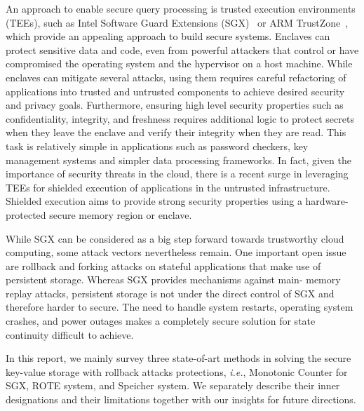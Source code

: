An approach to enable secure query processing is trusted execution environments (TEEs), such as Intel Software Guard Extensions 
(SGX)~\cite{sgxexplained} or ARM TrustZone~\cite{winter2008trusted}, which provide an appealing approach to build secure systems. Enclaves can protect sensitive data and code, even from powerful attackers that control or have compromised the operating system and the hypervisor on a host machine. While enclaves can mitigate several attacks, using them requires careful refactoring of applications into trusted and untrusted components to achieve desired security and privacy goals. Furthermore, ensuring high level security properties such as confidentiality, integrity, and freshness requires additional logic to protect secrets when they leave the enclave and verify their integrity when they are read. This task is relatively simple in applications such as password checkers, key management systems and simpler data processing frameworks. In fact, given the importance of security threats in the cloud, there is a recent surge in leveraging TEEs for shielded execution of applications in the untrusted infrastructure. Shielded execution aims to provide strong security properties using a hardware-protected secure memory region or enclave.

While SGX can be considered as a big step forward towards trustworthy cloud computing, some attack vectors nevertheless remain. One important open issue are rollback and forking attacks on stateful applications that make use of persistent storage. Whereas SGX provides mechanisms against main- memory replay attacks, persistent storage is not under the direct control of SGX and therefore harder to secure. The need to handle system restarts, operating system crashes, and power outages makes a completely secure solution for state continuity difficult to achieve. 

In this report, we mainly survey three state-of-art methods in solving the secure key-value storage with rollback attacks protections, \textit{i.e.}, Monotonic Counter for SGX, ROTE system, and Speicher system. We separately describe their inner designations and their limitations together with our insights for future directions.

